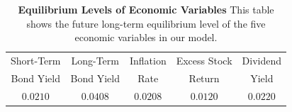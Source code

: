 \documentclass{sfuthesis}
\numberwithin{equation}{chapter}
\begin{document}
		\justify
		\begin{table}[!ht]
			\centering
			
			\begin{tabular}{ccccc}
				\toprule
				Short-Term  & Long-Term  &Inflation  &Excess Stock  &Dividend \\
				Bond Yield  & Bond Yield & Rate      &Return        & Yield\\
				\midrule
				$0.0210$   &$0.0408$    &$0.0208$    &$0.0120$     &$0.0220$ \\
				\bottomrule
			\end{tabular}
			
			\caption[Equilibrium Levels of Economic Variables]{\textbf{Equilibrium Levels of Economic Variables}
			\newline\footnotesize \justify This table shows the future long-term equilibrium level of the five economic variables in our model.}
			\label{table:Equilibrium Levels of Economic Variables}
		\end{table}
\end{document}
